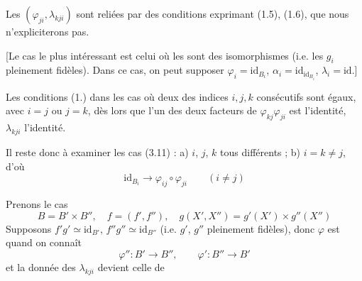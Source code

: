 \documentclass[11pt,a4paper]{article}
\begin{document}

Les $(\varphi_{ji}, \lambda_{kji})$ sont reliées par des conditions exprimant
(1.5), (1.6), que nous n'expliciterons pas.


[Le cas le plus intéressant est celui où les \struck{$\varphi$}
 sont des isomorphismes (i.e. les $g_{i}$ pleinement
fidèles). Dans ce cas,  on peut supposer
$\varphi_{i} = \mathrm{id}_{B_{i}}$,
$\alpha_{i} = \mathrm{id}_{\mathrm{id}_{B_{i}}}$, $\lambda_{i} = \mathrm{id}$.]

Les conditions (1.)  dans les cas où deux des indices $i, j, k$ consécutifs sont égaux,
avec $i = j$ ou $j = k$, dès lors que l'un des deux facteurs de
$\varphi_{kj} \varphi_{ji}$ est l'identité, \ill{} $\lambda_{kji}$
l'identité.

Il reste donc à examiner les cas (3.11) : a) $i$, $j$, $k$ tous
différents ; b) $i = k \neq j$, d'où
\[
  \mathrm{id}_{B_{i}} \longrightarrow \varphi_{ij} \circ \varphi_{ji}
  \qquad (i \neq j)
\]

Prenons le cas
\[
  B = B' \times B'' , \quad f = (f', f'') , \quad
  g(X', X'') = g'(X') \times g''(X'')
  \tag{3.12}
\]
Supposons $f' g' \simeq \mathrm{id}_{B'}$, $f'' g'' \simeq \mathrm{id}_{B''}$
(i.e. $g'$, $g''$ pleinement fidèles), donc $\varphi$ est 
 quand on connaît
\[
  \varphi'' : B' \longrightarrow B'' , \qquad
  \varphi' : B'' \longrightarrow B'
  \tag{3.13}
\]
et la donnée des \struck{$\alpha$} $\lambda_{kji}$ devient celle de


\end{document}
